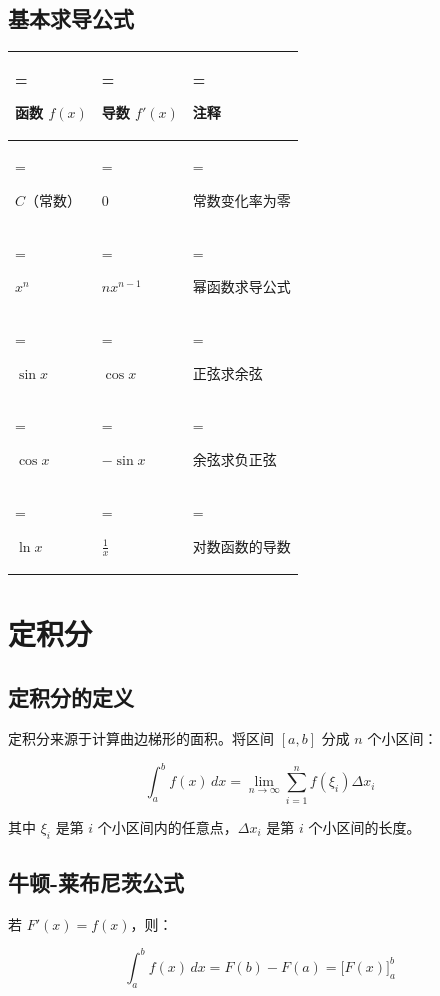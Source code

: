 \documentclass{harryopo-mathnotes}
\begin{document}
\subsection{基本求导公式}\label{ux57faux672cux6c42ux5bfcux516cux5f0f}

\begin{table}[htbp]
\centering
\begin{tabularx}{\textwidth}{>{\hsize=0.794\hsize\linewidth=\hsize\raggedright\arraybackslash}X>{\hsize=0.971\hsize\linewidth=\hsize\raggedright\arraybackslash}X>{\hsize=1.235\hsize\linewidth=\hsize\raggedright\arraybackslash}X}
\toprule
\textbf{函数 \(f(x)\)} & \textbf{导数 \(f'(x)\)} & \textbf{注释} \\
\midrule
\(C\)（常数） & \(0\) & 常数变化率为零 \\
\(x^n\) & \(nx^{n-1}\) & 幂函数求导公式 \\
\(\sin x\) & \(\cos x\) & 正弦求余弦 \\
\(\cos x\) & \(-\sin x\) & 余弦求负正弦 \\
\(\ln x\) & \(\frac{1}{x}\) & 对数函数的导数 \\
\bottomrule
\end{tabularx}
\end{table}

\section{定积分}\label{ux5b9aux79efux5206}

\subsection{定积分的定义}\label{ux5b9aux79efux5206ux7684ux5b9aux4e49}

定积分来源于计算曲边梯形的面积。将区间 \([a, b]\) 分成 \(n\) 个小区间：

\[\int_a^b f(x)\,dx = \lim_{n \to \infty} \sum_{i=1}^{n} f(\xi_i) \Delta x_i\]

其中 \(\xi_i\) 是第 \(i\) 个小区间内的任意点，\(\Delta x_i\) 是第 \(i\)
个小区间的长度。

\subsection{牛顿-莱布尼茨公式}\label{ux725bux987f-ux83b1ux5e03ux5c3cux8328ux516cux5f0f}

若 \(F'(x) = f(x)\)，则：

\[\int_a^b f(x)\,dx = F(b) - F(a) = \big[F(x)\big]_a^b\]
\end{document}
